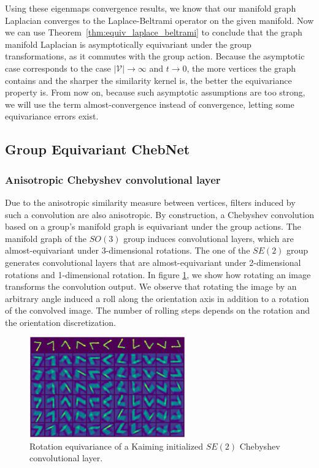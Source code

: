 \documentclass{article}
\begin{document}
Using these eigenmaps convergence results, we know that our manifold graph Laplacian converges to the Laplace-Beltrami operator on the given manifold. Now we can use Theorem~\ref{thm:equiv_laplace_beltrami} to conclude that the graph manifold Laplacian is asymptotically equivariant under the group transformations, as it commutes with the group action. Because the asymptotic case corresponds to the case $|\mathcal{V}| \to \infty$ and $t \to 0$, the more vertices the graph contains and the sharper the similarity kernel is, the better the equivariance property is. From now on, because such asymptotic assumptions are too strong, we will use the term almost-convergence instead of convergence, letting some equivariance errors exist.

\subsection{Group Equivariant ChebNet}

\subsubsection{Anisotropic Chebyshev convolutional layer}

Due to the anisotropic similarity measure between vertices, filters induced by such a convolution are also anisotropic. By construction, a Chebyshev convolution based on a group's manifold graph is equivariant under the group actions. The manifold graph of the $SO(3)$ group induces convolutional layers, which are almost-equivariant under 3-dimensional rotations. The one of the $SE(2)$ group generates convolutional layers that are almost-equivariant under 2-dimensional rotations and 1-dimensional rotation. In figure \ref{fig:7_filters}, we show how rotating an image transforms the convolution output. We observe that rotating the image by an arbitrary angle induced a roll along the orientation axis in addition to a rotation of the convolved image. The number of rolling steps depends on the rotation and the orientation discretization.

\begin{figure}[h!] 
    \centering
    \includegraphics[width=0.6\textwidth]{Images/chebconv_filters.png}
    \caption{Rotation equivariance of a Kaiming initialized $SE(2)$ Chebyshev convolutional layer.}
    \label{fig:7_filters}
\end{figure}
\end{document}
